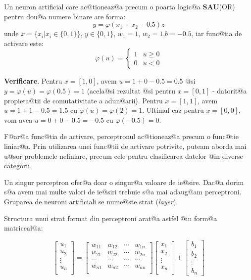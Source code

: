 \begin{exemplu}

	Un neuron artificial care ac@tioneaz@a precum o poarta logic@a {\bf SAU}(OR) pentru dou@a numere binare are forma:
$$
	y = \varphi ( x_1 + x_2 - 0.5 )z
$$
\noindent unde $x = \{ x_i | x_i \in \{0, 1\} \}$, $y \in \{0, 1\}$, $w_1 = 1$, $w_2 = 1$,$b = -0.5$, iar func@tia de activare este: 
$$
	\varphi ( u ) = \left\lbrace
		\begin{array}{lc}
			1 & u \geq 0 \\
			0 & u < 0
		\end{array}
	\right.
$$
\end{exemplu}

{\bf Verificare}. Pentru $x = [1, 0]$, avem $u = 1 + 0 - 0.5 = 0.5$ @si $y = \varphi(u) = \varphi(0.5) = 1$ (acela@si rezultat @si pentru $x = [0, 1]$ - datorit@a propieta@tii de comutativitate a adun@arii).
Pentru $x = [1, 1]$, avem $u = 1 + 1 - 0.5 = 1.5$ cu $\varphi (u) = \varphi ( 2 ) = 1$. Ultimul caz pentru $x = [0, 0]$, vom avea $u = 0 + 0 - 0.5 = -0.5$ cu $\varphi (-0.5) = 0$.

\begin{observatia}
	F@ar@a func@tia de activare, perceptronul ac@tioneaz@a precum o func@tie liniar@a. Prin utilizarea unei func@tii de activare potrivite, puteam aborda mai u@sor problemele neliniare, precum cele pentru clasificarea datelor @in diverse categorii.
\end{observatia}

Un singur perceptron ofer@a doar o singur@a valoare de ie@sire. Dac@a dorim s@a avem mai multe valori de ie@siri trebuie s@a mai adaug@am perceptroni. Gruparea de neuroni artificiali se nume@ste strat ({\sl layer}).

Structura unui strat format din perceptroni arat@a astfel @in form@a matriceal@a:

$$
	\begin{bmatrix}
		u_1 \\
		u_2 \\
		\vdots \\ 
		u_n \\
	\end{bmatrix}	
	= 
	\begin{bmatrix}
		w_{11} & w_{12} & \cdots & w_{1n} \\
		w_{21} & w_{22} & \cdots & w_{2n} \\
		\cdots & \cdots & \cdots & \cdots \\
		w_{n1} & w_{n2} & \cdots & w_{nn} \\
	\end{bmatrix}
	\begin{bmatrix}
		x_1 \\
		x_2 \\
		\vdots \\
		x_n \\
	\end{bmatrix}
	+
	\begin{bmatrix}
		b_1 \\
		b_2 \\
		\vdots \\
		b_n
	\end{bmatrix}
$$

